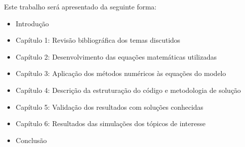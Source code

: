 Este trabalho será apresentado da seguinte forma:
\begin{itemize}
	\item Introdução
	\item Capítulo 1: Revisão bibliográfica dos temas discutidos
	\item Capítulo 2: Desenvolvimento das equações matemáticas utilizadas
	\item Capítulo 3: Aplicação dos métodos numéricos às equações do modelo
	\item Capítulo 4: Descrição da estruturação do código e metodologia de solução
	\item Capítulo 5: Validação dos resultados com soluções conhecidas
	\item Capítulo 6: Resultados das simulações dos tópicos de interesse
	\item Conclusão
\end{itemize}
